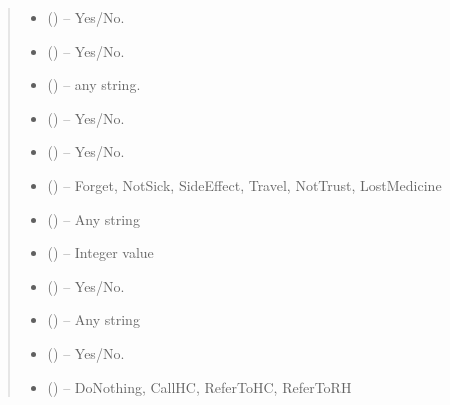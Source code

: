 \documentclass[letterpaper,10pt,english,openany,oneside]{sphinxmanual}
\begin{document}
\begin{fulllineitems}
\begin{quote}
\begin{description}
\begin{itemize}
\item {} 
\sphinxAtStartPar
{} () – Yes/No.

\item {} 
\sphinxAtStartPar
{} () – Yes/No.

\item {} 
\sphinxAtStartPar
{} () – any string.

\item {} 
\sphinxAtStartPar
{} () – Yes/No.

\item {} 
\sphinxAtStartPar
{} () – Yes/No.

\item {} 
\sphinxAtStartPar
{} () – Forget, NotSick, SideEffect, Travel, NotTrust, LostMedicine

\item {} 
\sphinxAtStartPar
{} () – Any string

\item {} 
\sphinxAtStartPar
{} () – Integer value

\item {} 
\sphinxAtStartPar
{} () – Yes/No.

\item {} 
\sphinxAtStartPar
{} () – Any string

\item {} 
\sphinxAtStartPar
{} () – Yes/No.

\item {} 
\sphinxAtStartPar
{} () – DoNothing, CallHC, ReferToHC, ReferToRH

\end{itemize}

\end{description}\end{quote}

\end{fulllineitems}
\end{document}
